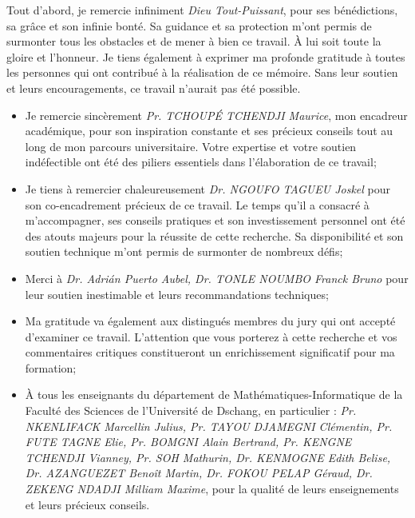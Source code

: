 
Tout d'abord, je remercie infiniment \textit{Dieu Tout-Puissant}, pour ses bénédictions, sa grâce et son infinie bonté. Sa guidance et sa protection m'ont permis de surmonter tous les obstacles et de mener à bien ce travail. À lui soit toute la gloire et l'honneur.
Je tiens également à exprimer ma profonde gratitude à toutes les personnes qui ont contribué à la réalisation de ce mémoire. Sans leur soutien et leurs encouragements, ce travail n'aurait pas été possible.

\begin{itemize}
    \item Je remercie sincèrement \textit{Pr. TCHOUP\'E TCHENDJI Maurice}, mon encadreur académique, pour son inspiration constante et ses précieux conseils tout au long de mon parcours universitaire. Votre expertise et votre soutien indéfectible ont été des piliers essentiels dans l'élaboration de ce travail;
    \item Je tiens à remercier chaleureusement \textit{Dr. NGOUFO TAGUEU Joskel} pour son co-encadrement précieux de ce travail. Le temps qu'il a consacré à m'accompagner, ses conseils pratiques et son investissement personnel ont été des atouts majeurs pour la réussite de cette recherche. Sa disponibilité et son soutien technique m'ont permis de surmonter de nombreux défis;
    \item Merci à \textit{Dr. Adri\'an Puerto Aubel, Dr. TONLE NOUMBO Franck Bruno} pour leur soutien inestimable et leurs recommandations techniques;  
    \item Ma gratitude va également aux distingués membres du jury qui ont accepté d'examiner ce travail. L'attention que vous porterez à cette recherche et vos commentaires critiques constitueront un enrichissement significatif pour ma formation;
    \item À tous les enseignants du département de  Mathématiques-Informatique de la Faculté des Sciences de l'Université de Dschang, en particulier : \textit{Pr. NKENLIFACK Marcellin Julius, Pr. TAYOU DJAMEGNI Clémentin, Pr. FUTE TAGNE Elie, Pr. BOMGNI Alain Bertrand, Pr. KENGNE TCHENDJI Vianney, Pr. SOH Mathurin, Dr. KENMOGNE Edith Belise, Dr. AZANGUEZET Benoît Martin, Dr. FOKOU PELAP Géraud, Dr. ZEKENG NDADJI Milliam Maxime}, pour la qualité de leurs enseignements et leurs précieux conseils.

\end{itemize}
